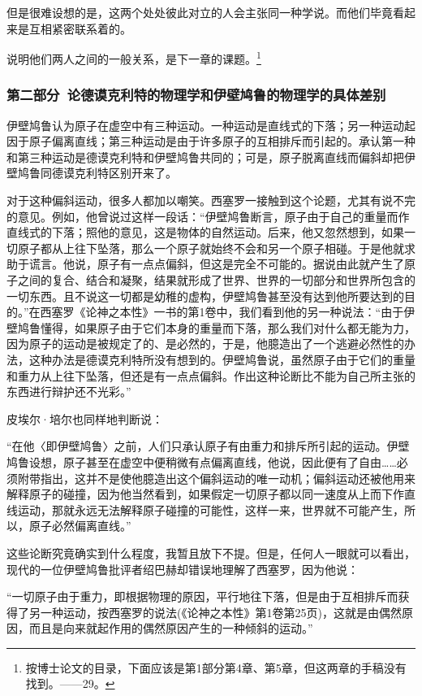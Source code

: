 \documentclass[a4paper,twoside,12pt]{ctexart}
\begin{document}
但是很难设想的是，这两个处处彼此对立的人会主张同一种学说。而他们毕竟看起来是互相紧密联系着的。

说明他们两人之间的一般关系，是下一章的课题。\footnote{按博士论文的目录，下面应该是第1部分第4章、第5章，但这两章的手稿没有找到。——29。}

\subsubsection{第二部分~论德谟克利特的物理学和伊壁鸠鲁的物理学的具体差别}

 伊壁鸠鲁认为原子在虚空中有三种运动。一种运动是直线式的下落；另一种运动起因于原子偏离直线；第三种运动是由于许多原子的互相排斥而引起的。承认第一种和第三种运动是德谟克利特和伊壁鸠鲁共同的；可是，原子脱离直线而偏斜却把伊壁鸠鲁同德谟克利特区别开来了。

对于这种偏斜运动，很多人都加以嘲笑。西塞罗一接触到这个论题，尤其有说不完的意见。例如，他曾说过这样一段话：“伊壁鸠鲁断言，原子由于自己的重量而作直线式的下落；照他的意见，这是物体的自然运动。后来，他又忽然想到，如果一切原子都从上往下坠落，那么一个原子就始终不会和另一个原子相碰。于是他就求助于谎言。他说，原子有一点点偏斜，但这是完全不可能的。据说由此就产生了原子之间的复合、结合和凝聚，结果就形成了世界、世界的一切部分和世界所包含的一切东西。且不说这一切都是幼稚的虚构，伊壁鸠鲁甚至没有达到他所要达到的目的。”在西塞罗《论神之本性》一书的第1卷中，我们看到他的另一种说法：“由于伊壁鸠鲁懂得，如果原子由于它们本身的重量而下落，那么我们对什么都无能为力，因为原子的运动是被规定了的、是必然的，于是，他臆造出了一个逃避必然性的办法，这种办法是德谟克利特所没有想到的。伊壁鸠鲁说，虽然原子由于它们的重量和重力从上往下坠落，但还是有一点点偏斜。作出这种论断比不能为自己所主张的东西进行辩护还不光彩。”

皮埃尔·培尔也同样地判断说：

\begin{fangsong}
    “在他〈即伊壁鸠鲁〉之前，人们只承认原子有由重力和排斥所引起的运动。伊壁鸠鲁设想，原子甚至在虚空中便稍微有点偏离直线，他说，因此便有了自由……必须附带指出，这并不是使他臆造出这个偏斜运动的唯一动机；偏斜运动还被他用来解释原子的碰撞，因为他当然看到，如果假定一切原子都以同一速度从上而下作直线运动，那就永远无法解释原子碰撞的可能性，这样一来，世界就不可能产生，所以，原子必然偏离直线。”
\end{fangsong}

这些论断究竟确实到什么程度，我暂且放下不提。但是，任何人一眼就可以看出，现代的一位伊壁鸠鲁批评者绍巴赫却错误地理解了西塞罗，因为他说：

\begin{fangsong}
    “一切原子由于重力，即根据物理的原因，平行地往下落，但是由于互相排斥而获得了另一种运动，按西塞罗的说法(《论神之本性》第1卷第25页)，这就是由偶然原因，而且是向来就起作用的偶然原因产生的一种倾斜的运动。”
\end{fangsong}
\end{document}
